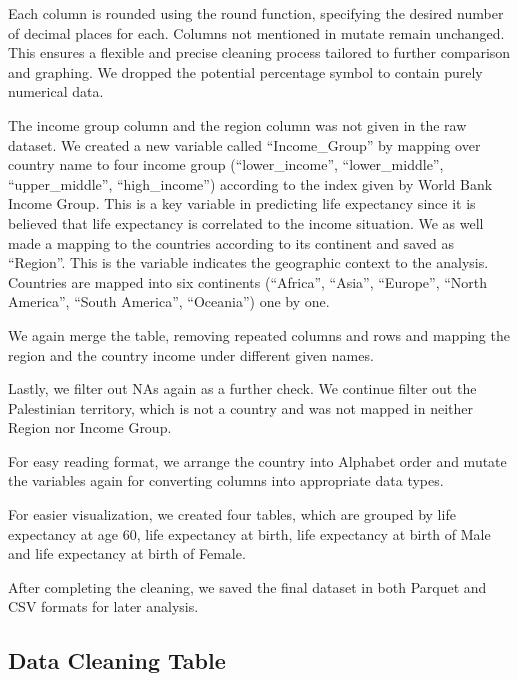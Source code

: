 \documentclass[
  letterpaper,
  DIV=11,
  numbers=noendperiod]{scrartcl}
\begin{document}
Each column is rounded using the round function, specifying the desired
number of decimal places for each. Columns not mentioned in mutate
remain unchanged. This ensures a flexible and precise cleaning process
tailored to further comparison and graphing. We dropped the potential
percentage symbol to contain purely numerical data.

The income group column and the region column was not given in the raw
dataset. We created a new variable called ``Income\_Group'' by mapping
over country name to four income group (``lower\_income'',
``lower\_middle'', ``upper\_middle'', ``high\_income'') according to the
index given by World Bank Income Group. This is a key variable in
predicting life expectancy since it is believed that life expectancy is
correlated to the income situation. We as well made a mapping to the
countries according to its continent and saved as ``Region''. This is
the variable indicates the geographic context to the analysis. Countries
are mapped into six continents (``Africa'', ``Asia'', ``Europe'',
``North America'', ``South America'', ``Oceania'') one by one.

We again merge the table, removing repeated columns and rows and mapping
the region and the country income under different given names.

Lastly, we filter out NAs again as a further check. We continue filter
out the Palestinian territory, which is not a country and was not mapped
in neither Region nor Income Group.

For easy reading format, we arrange the country into Alphabet order and
mutate the variables again for converting columns into appropriate data
types.

For easier visualization, we created four tables, which are grouped by
life expectancy at age 60, life expectancy at birth, life expectancy at
birth of Male and life expectancy at birth of Female.

After completing the cleaning, we saved the final dataset in both
Parquet and CSV formats for later analysis.

\subsection{Data Cleaning Table}\label{data-cleaning-table}

\begingroup\fontsize{5.5}{7.5}\selectfont
\end{document}
